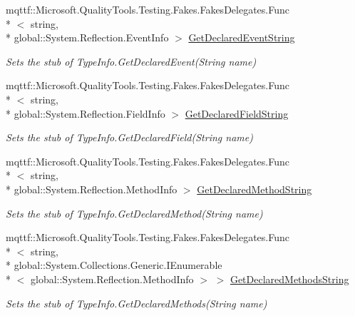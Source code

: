 \begin{DoxyCompactItemize}
mqttf\-::\-Microsoft.\-Quality\-Tools.\-Testing.\-Fakes.\-Fakes\-Delegates.\-Func\\*
$<$ string, \\*
global\-::\-System.\-Reflection.\-Event\-Info $>$ \hyperlink{class_system_1_1_reflection_1_1_fakes_1_1_stub_type_delegator_a9bf9a73f772ec880c675ee6cb0c2babb}{Get\-Declared\-Event\-String}
\begin{DoxyCompactList}\small\item\em Sets the stub of Type\-Info.\-Get\-Declared\-Event(\-String name)\end{DoxyCompactList}\item 
mqttf\-::\-Microsoft.\-Quality\-Tools.\-Testing.\-Fakes.\-Fakes\-Delegates.\-Func\\*
$<$ string, \\*
global\-::\-System.\-Reflection.\-Field\-Info $>$ \hyperlink{class_system_1_1_reflection_1_1_fakes_1_1_stub_type_delegator_a9e5093426967e4108fa7abdcbc7b1594}{Get\-Declared\-Field\-String}
\begin{DoxyCompactList}\small\item\em Sets the stub of Type\-Info.\-Get\-Declared\-Field(\-String name)\end{DoxyCompactList}\item 
mqttf\-::\-Microsoft.\-Quality\-Tools.\-Testing.\-Fakes.\-Fakes\-Delegates.\-Func\\*
$<$ string, \\*
global\-::\-System.\-Reflection.\-Method\-Info $>$ \hyperlink{class_system_1_1_reflection_1_1_fakes_1_1_stub_type_delegator_a766428f21437c57fcab4b952d305ea25}{Get\-Declared\-Method\-String}
\begin{DoxyCompactList}\small\item\em Sets the stub of Type\-Info.\-Get\-Declared\-Method(\-String name)\end{DoxyCompactList}\item 
mqttf\-::\-Microsoft.\-Quality\-Tools.\-Testing.\-Fakes.\-Fakes\-Delegates.\-Func\\*
$<$ string, \\*
global\-::\-System.\-Collections.\-Generic.\-I\-Enumerable\\*
$<$ global\-::\-System.\-Reflection.\-Method\-Info $>$ $>$ \hyperlink{class_system_1_1_reflection_1_1_fakes_1_1_stub_type_delegator_a70f63b79f87fa529842e76f87dbb0d39}{Get\-Declared\-Methods\-String}
\begin{DoxyCompactList}\small\item\em Sets the stub of Type\-Info.\-Get\-Declared\-Methods(\-String name)\end{DoxyCompactList}\item 

\end{DoxyCompactItemize}
